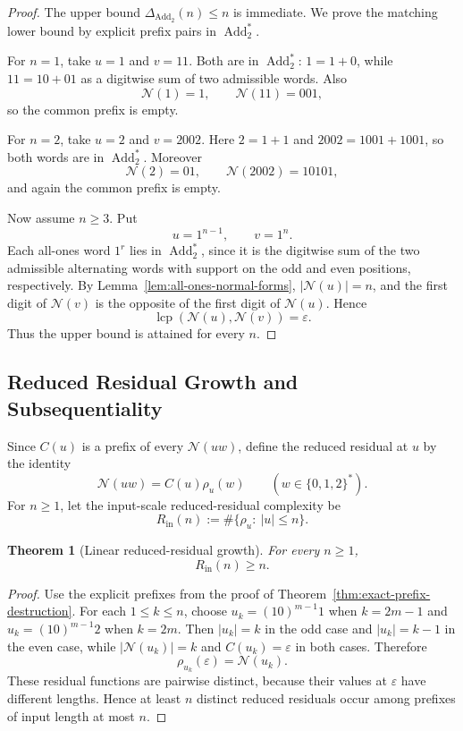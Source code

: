 \documentclass[11pt,letterpaper]{article}
\numberwithin{equation}{section}
\theoremstyle{plain}
\newtheorem{theorem}{Theorem}[section]
\theoremstyle{definition}
\theoremstyle{remark}
\DeclareMathOperator{\lcp}{lcp}
\newcommand{\AddTwo}{\operatorname{Add}_{2}}
\begin{document}
\begin{proof}
The upper bound $\Delta_{\AddTwo}(n)\le n$ is immediate.  We prove the matching
lower bound by explicit prefix pairs in $\AddTwo^\ast$.

For $n=1$, take $u=1$ and $v=11$.  Both are in $\AddTwo^\ast$:
$1=1+0$, while $11=10+01$ as a digitwise sum of two admissible words.  Also
\[
\mathcal N(1)=1,\qquad \mathcal N(11)=001,
\]
so the common prefix is empty.

For $n=2$, take $u=2$ and $v=2002$.  Here $2=1+1$ and
$2002=1001+1001$, so both words are in $\AddTwo^\ast$.  Moreover
\[
\mathcal N(2)=01,\qquad \mathcal N(2002)=10101,
\]
and again the common prefix is empty.

Now assume $n\ge 3$.  Put
\[
u=1^{n-1},\qquad v=1^n.
\]
Each all-ones word $1^r$ lies in $\AddTwo^\ast$, since it is the digitwise sum
of the two admissible alternating words with support on the odd and even
positions, respectively.  By Lemma~\ref{lem:all-ones-normal-forms},
$|\mathcal N(u)|=n$, and the first digit of $\mathcal N(v)$ is the opposite
of the first digit of $\mathcal N(u)$.  Hence
\[
\lcp(\mathcal N(u),\mathcal N(v))=\varepsilon.
\]
Thus the upper bound is attained for every $n$.
\end{proof}

\subsection{Reduced Residual Growth and Subsequentiality}

Since $C(u)$ is a prefix of every $\mathcal N(uw)$, define the reduced
residual at $u$ by the identity
\[
\mathcal N(uw)=C(u)\rho_u(w)
\qquad (w\in\{0,1,2\}^\ast).
\]
For $n\ge 1$, let the input-scale reduced-residual complexity be
\[
R_{\mathrm{in}}(n):=\#\{\rho_u:\ |u|\le n\}.
\]

\begin{theorem}[Linear reduced-residual growth]\label{thm:reduced-residual-growth}
For every $n\ge 1$,
\[
R_{\mathrm{in}}(n)\ge n.
\]
\end{theorem}

\begin{proof}
Use the explicit prefixes from the proof of
Theorem~\ref{thm:exact-prefix-destruction}.  For each $1\le k\le n$, choose
$u_k=(10)^{m-1}1$ when $k=2m-1$ and $u_k=(10)^{m-1}2$ when $k=2m$.
Then $|u_k|=k$ in the odd case and $|u_k|=k-1$ in the even case, while
$|\mathcal N(u_k)|=k$ and $C(u_k)=\varepsilon$ in both cases.  Therefore
\[
\rho_{u_k}(\varepsilon)=\mathcal N(u_k).
\]
These residual functions are pairwise distinct, because their values at
$\varepsilon$ have different lengths.  Hence at least $n$ distinct reduced
residuals occur among prefixes of input length at most $n$.
\end{proof}
\end{document}
